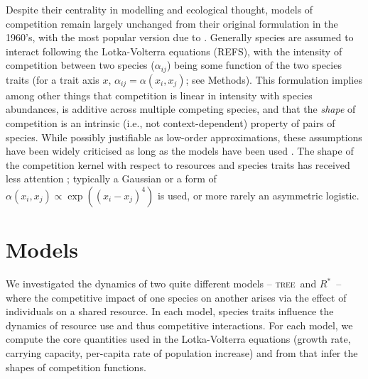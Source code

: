 \documentclass[a4paper,11pt]{article}
\newcommand{\Rstar}{\ensuremath{R^*}}
\newcommand{\TREE}{\textsc{tree}}
\begin{document}
Despite their centrality in modelling and ecological thought, models
of competition remain largely unchanged from their original
formulation in the 1960's, with the most popular version due to
\citet{MacArthur-1967}.
Generally species are assumed to interact following the Lotka-Volterra
equations (REFS), with the intensity of competition between two
species ($\alpha_{ij}$) being some function of the two species traits
(for a trait axis $x$, $\alpha_{ij} = \alpha(x_i, x_j)$; see Methods).
%
This formulation implies among other things that competition is linear
in intensity with species abundances, is additive across multiple
competing species, and that the \emph{shape} of competition is an
intrinsic (i.e., not context-dependent) property of pairs of species.
%
While possibly justifiable as low-order approximations, these
assumptions have been widely criticised as long as the models have
been used
\citep[e.g.][]{Andrewartha-1953,May-1972,Abrams-1975}.
%
The shape of the competition kernel with respect to resources and
species traits has received less attention \citep[but
see][]{Abrams-2008,Leimar-2013}; typically a Gaussian or a form of
$\alpha(x_i, x_j) \propto \exp((x_i - x_j)^4)$ is used, or more rarely
an asymmetric logistic.
%




\section{Models}



We investigated the dynamics of two quite different models -- \TREE\ and \Rstar\
-- where the competitive impact of one species on another arises via the
effect of individuals on a shared resource. In each model, species traits
influence the dynamics of resource use and thus competitive interactions. For
each model, we compute the core quantities used in the Lotka-Volterra
equations (growth rate, carrying capacity,  per-capita rate of population
increase) and from that infer the shapes of competition functions.
\end{document}
